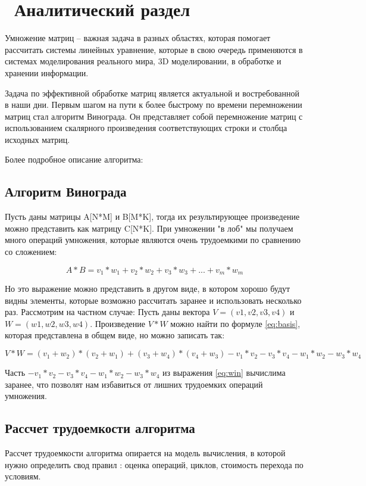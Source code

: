\chapter{ Аналитический раздел}
\label{cha:analysis}

Умножение матриц -- важная задача в разных областях, которая помогает рассчитать системы линейных уравнение, которые в свою очередь применяются в системах моделирования реального мира, 3D моделировании, в обработке и хранении информации. 

Задача по эффективной обработке матриц является актуальной и востребованной в наши дни. Первым шагом на пути к более быстрому по времени перемножении матриц стал алгоритм Винограда. Он представляет собой перемножение матриц с использованием скалярного произведения соответствующих строки и столбца исходных матриц.

Более подробное описание алгоритма: 

\section{ Алгоритм Винограда}

Пусть даны матрицы A[N*M] и B[M*K], тогда их результирующее произведение можно представить как матрицу C[N*K]. При умножении "в лоб" мы получаем много операций умножения, которые являются очень трудоемкими по сравнению со сложением:

\begin{equation}
    A * B = v_1*w_1 + v_2 * w_2 + v_3 * w_3 + ... + v_m * w_m
    \label{eq:basis}
\end{equation}

Но это выражение можно представить в другом виде, в котором хорошо будут видны элементы, которые возможно рассчитать заранее и использовать несколько раз. Рассмотрим на частном случае:
Пусть даны вектора $V = (v1, v2, v3, v4)$ и $W = (w1, w2, w3, w4)$. Произведение $V*W$ можно найти по формуле \ref{eq:basis}, которая представлена в общем виде, но можно записать так:

\begin{equation}
    V*W = (v_1 + w_2)*(v_2 + w_1) + (v_3 + w_4)*(v_4+w_3) - v_1 * v_2 - v_3 * v_4 - w_1 * w_2 - w_3 * w_4
    \label{eq:win}
\end{equation}

Часть $- v_1 * v_2 - v_3 * v_4 - w_1 * w_2 - w_3 * w_4$ из выражения \ref{eq:win} вычислима заранее, что позволят нам избавиться от лишних трудоемких операций умножения.

\section{ Рассчет трудоемкости алгоритма}

Рассчет трудоемкости алгоритма опирается на модель вычисления, в которой нужно определить свод правил : оценка операций, циклов, стоимость перехода по условиям.
